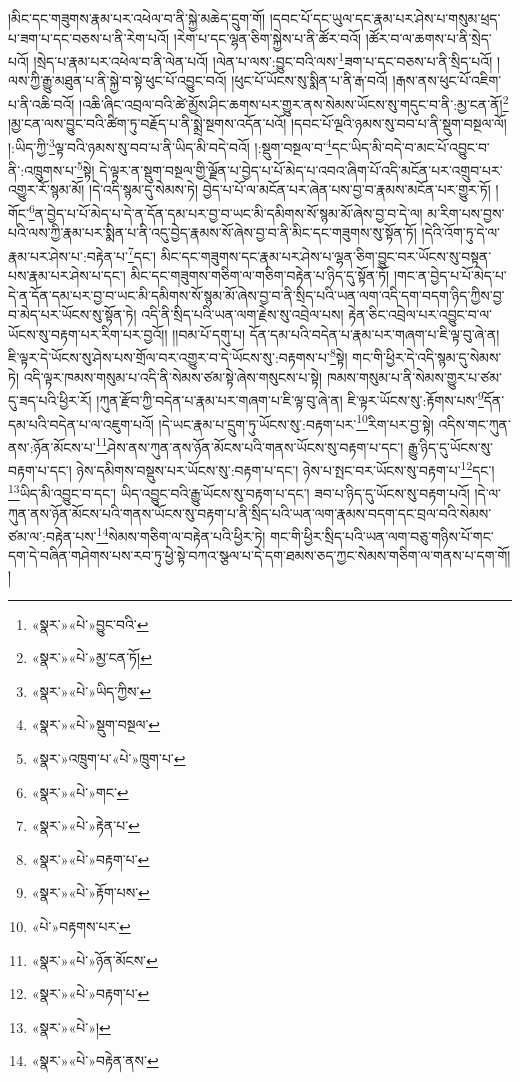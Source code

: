 །མིང་དང་གཟུགས་རྣམ་པར་འཕེལ་བ་ནི་སྐྱེ་མཆེད་དྲུག་གོ། །དབང་པོ་དང་ཡུལ་དང་རྣམ་པར་ཤེས་པ་གསུམ་ཕྲད་པ་ཟག་པ་དང་བཅས་པ་ནི་རེག་པའོ། །རེག་པ་དང་ལྷན་ཅིག་སྐྱེས་པ་ནི་ཚོར་བའོ། །ཚོར་བ་ལ་ཆགས་པ་ནི་སྲེད་པའོ། །སྲེད་པ་རྣམ་པར་འཕེལ་བ་ནི་ལེན་པའོ། །ལེན་པ་ལས་:བྱུང་བའི་ལས་\footnote{«སྣར་»«པེ་»བྱུང་བའི་}ཟག་པ་དང་བཅས་པ་ནི་སྲིད་པའོ། །ལས་ཀྱི་རྒྱུ་མཐུན་པ་ནི་སྐྱེ་བ་སྟེ་ཕུང་པོ་འབྱུང་བའོ། །ཕུང་པོ་ཡོངས་སུ་སྨིན་པ་ནི་རྒ་བའོ། །རྒས་ནས་ཕུང་པོ་འཇིག་པ་ནི་འཆི་བའོ། །འཆི་ཞིང་འབྲལ་བའི་ཚེ་མྱོས་ཤིང་ཆགས་པར་གྱུར་ནས་སེམས་ཡོངས་སུ་གདུང་བ་ནི་:མྱ་ངན་ནོ།\footnote{«སྣར་»«པེ་»མྱ་ངན་ཏོ།} །མྱ་ངན་ལས་བྱུང་བའི་ཚིག་ཏུ་བརྗོད་པ་ནི་སྨྲེ་སྔགས་འདོན་པའོ། །དབང་པོ་ལྔའི་ཉམས་སུ་བབ་པ་ནི་སྡུག་བསྔལ་ལོ། །:ཡིད་ཀྱི་\footnote{«སྣར་»«པེ་»ཡིད་ཀྱིས་}ལྟ་བའི་ཉམས་སུ་བབ་པ་ནི་ཡིད་མི་བདེ་བའོ། །:སྡུག་བསྔལ་བ་\footnote{«སྣར་»«པེ་»སྡུག་བསྔལ་}དང་ཡིད་མི་བདེ་བ་མང་པོ་འབྱུང་བ་ནི་:འཁྲུགས་པ་\footnote{«སྣར་»འཁྲུག་པ་«པེ་»ཁྲུག་པ་}སྟེ། དེ་ལྟར་ན་སྡུག་བསྔལ་གྱི་ལྗོན་པ་བྱེད་པ་པོ་མེད་པ་འབའ་ཞིག་པོ་འདི་མངོན་པར་འགྲུབ་པར་འགྱུར་རོ་སྙམ་མོ། །དེ་འདི་སྙམ་དུ་སེམས་ཏེ། བྱེད་པ་པོ་ལ་མངོན་པར་ཞེན་པས་བྱ་བ་རྣམས་མངོན་པར་གྱུར་ཏོ། །གོང་\footnote{«སྣར་»«པེ་»གང་}ན་བྱེད་པ་པོ་མེད་པ་དེ་ན་དོན་དམ་པར་བྱ་བ་ཡང་མི་དམིགས་སོ་སྙམ་མོ་ཞེས་བྱ་བ་དེ་ལ། མ་རིག་པས་བྱས་པའི་ལས་ཀྱི་རྣམ་པར་སྨིན་པ་ནི་འདུ་བྱེད་རྣམས་སོ་ཞེས་བྱ་བ་ནི་མིང་དང་གཟུགས་སུ་སྟོན་ཏོ། །དེའི་འོག་ཏུ་དེ་ལ་རྣམ་པར་ཤེས་པ་:བརྟེན་པ་\footnote{«སྣར་»«པེ་»རྟེན་པ་}དང་། མིང་དང་གཟུགས་དང་རྣམ་པར་ཤེས་པ་ལྷན་ཅིག་བྱུང་བར་ཡོངས་སུ་བསྟན་པས་རྣམ་པར་ཤེས་པ་དང་། མིང་དང་གཟུགས་གཅིག་ལ་གཅིག་བརྟེན་པ་ཉིད་དུ་སྟོན་ཏོ། །གང་ན་བྱེད་པ་པོ་མེད་པ་དེ་ན་དོན་དམ་པར་བྱ་བ་ཡང་མི་དམིགས་སོ་སྙམ་མོ་ཞེས་བྱ་བ་ནི་སྲིད་པའི་ཡན་ལག་འདི་དག་བདག་ཉིད་ཀྱིས་བྱ་བ་མེད་པར་ཡོངས་སུ་སྟོན་ཏེ། འདི་ནི་སྲིད་པའི་ཡན་ལག་རྗེས་སུ་འབྲེལ་པས། རྟེན་ཅིང་འབྲེལ་པར་འབྱུང་བ་ལ་ཡོངས་སུ་བརྟག་པར་རིག་པར་བྱའོ།། །།བམ་པོ་དགུ་པ། དོན་དམ་པའི་བདེན་པ་རྣམ་པར་གཞག་པ་ཇི་ལྟ་བུ་ཞེ་ན། ཇི་ལྟར་དེ་ཡོངས་སུ་ཤེས་པས་གྲོལ་བར་འགྱུར་བ་དེ་ཡོངས་སུ་:བརྟགས་པ་\footnote{«སྣར་»«པེ་»བརྟག་པ་}སྟེ། གང་གི་ཕྱིར་དེ་འདི་སྙམ་དུ་སེམས་ཏེ། འདི་ལྟར་ཁམས་གསུམ་པ་འདི་ནི་སེམས་ཙམ་སྟེ་ཞེས་གསུངས་པ་སྟེ། ཁམས་གསུམ་པ་ནི་སེམས་གྱུར་པ་ཙམ་དུ་ཟད་པའི་ཕྱིར་རོ། །ཀུན་རྫོབ་ཀྱི་བདེན་པ་རྣམ་པར་གཞག་པ་ཇི་ལྟ་བུ་ཞེ་ན། ཇི་ལྟར་ཡོངས་སུ་:རྟོགས་པས་\footnote{«སྣར་»«པེ་»རྟོག་པས་}དོན་དམ་པའི་བདེན་པ་ལ་འཇུག་པའོ། །དེ་ཡང་རྣམ་པ་དྲུག་ཏུ་ཡོངས་སུ་:བརྟག་པར་\footnote{«པེ་»བརྟགས་པར་}རིག་པར་བྱ་སྟེ། འདིས་གང་ཀུན་ནས་:ཉོན་མོངས་པ་\footnote{«སྣར་»«པེ་»ཉོན་མོངས་}ཤེས་ནས་ཀུན་ནས་ཉོན་མོངས་པའི་གནས་ཡོངས་སུ་བརྟག་པ་དང་། རྒྱུ་ཉིད་དུ་ཡོངས་སུ་བརྟག་པ་དང་། ཉེས་དམིགས་བསྡུས་པར་ཡོངས་སུ་:བརྟག་པ་དང་། ཉེས་པ་སྤང་བར་ཡོངས་སུ་བརྟག་པ་\footnote{«སྣར་»«པེ་»བརྟག་པ་}དང་། \footnote{«སྣར་»«པེ་»།  }ཡིད་མི་འབྱུང་བ་དང་། ཡིད་འབྱུང་བའི་རྒྱུ་ཡོངས་སུ་བརྟག་པ་དང་། ཟབ་པ་ཉིད་དུ་ཡོངས་སུ་བརྟག་པའོ། །དེ་ལ་ཀུན་ནས་ཉོན་མོངས་པའི་གནས་ཡོངས་སུ་བརྟག་པ་ནི་སྲིད་པའི་ཡན་ལག་རྣམས་བདག་དང་བྲལ་བའི་སེམས་ཙམ་ལ་:བརྟེན་པས་\footnote{«སྣར་»«པེ་»བརྟེན་ནས་}སེམས་གཅིག་ལ་བརྟེན་པའི་ཕྱིར་ཏེ། གང་གི་ཕྱིར་སྲིད་པའི་ཡན་ལག་བཅུ་གཉིས་པོ་གང་དག་དེ་བཞིན་གཤེགས་པས་རབ་ཏུ་ཕྱེ་སྟེ་བཀའ་སྩལ་པ་དེ་དག་ཐམས་ཅད་ཀྱང་སེམས་གཅིག་ལ་གནས་པ་དག་གོ། །
